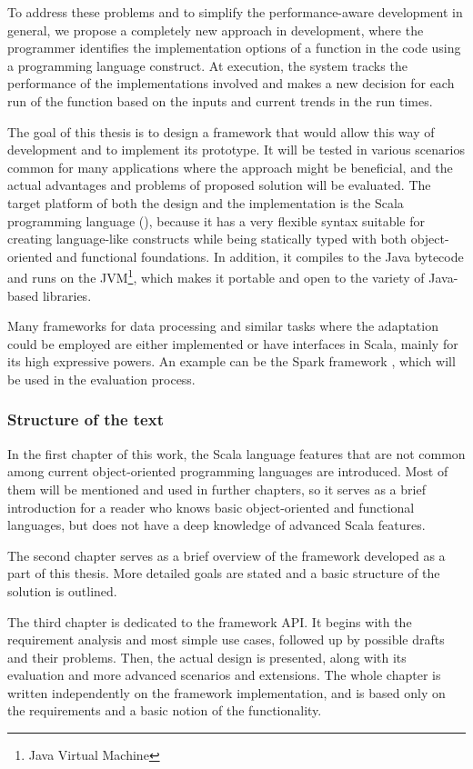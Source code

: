 To address these problems and to simplify the performance-aware development in general, we propose a completely new approach in development, where the programmer identifies the implementation options of a function in the code using a programming language construct. At execution, the system tracks the performance of the implementations involved and makes a new decision for each run of the function based on the inputs and current trends in the run times.

The goal of this thesis is to design a framework that would allow this way of development and to implement its prototype. It will be tested in various scenarios common for many applications where the approach might be beneficial, and the actual advantages and problems of proposed solution will be evaluated. The target platform of both the design and the implementation is the Scala programming language (\cite{noauthor_scala_nodate}), because it has a very flexible syntax suitable for creating language-like constructs while being statically typed with both object-oriented and functional foundations. In addition, it compiles to the Java bytecode and runs on the JVM\footnote{Java Virtual Machine}, which makes it portable and open to the variety of \mbox{Java-based} libraries. 

Many frameworks for data processing and similar tasks where the adaptation could be employed are either implemented or have interfaces in Scala, mainly for its high expressive powers. An example can be the Spark framework \cite{noauthor_apache_nodate}, which will be used in the evaluation process.

\subsubsection{Structure of the text}

In the first chapter of this work, the Scala language features that are not common among current object-oriented programming languages are introduced. Most of them will be mentioned and used in further chapters, so it serves as a brief introduction for a reader who knows basic object-oriented and functional languages, but does not have a deep knowledge of advanced Scala features.

The second chapter serves as a brief overview of the framework developed as a part of this thesis. More detailed goals are stated and a basic structure of the solution is outlined.

The third chapter is dedicated to the framework API. It begins with the requirement analysis and most simple use cases, followed up by possible drafts and their problems. Then, the actual design is presented, along with its evaluation and more advanced scenarios and extensions. The whole chapter is written independently on the framework implementation, and is based only on the requirements and a basic notion of the functionality.

